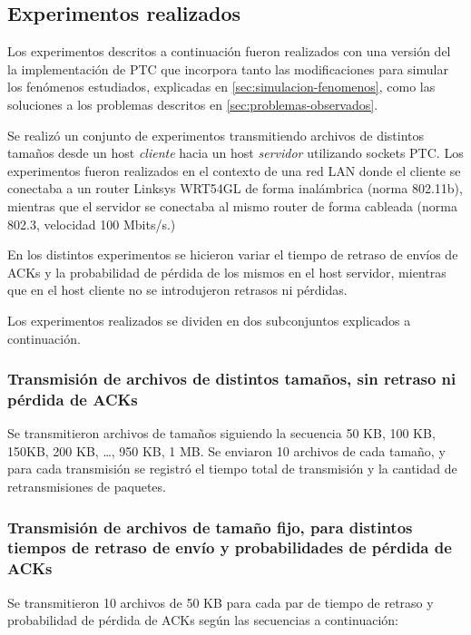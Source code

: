 \documentclass[a4paper, 10pt, twoside]{article}
\begin{document}
\subsection{Experimentos realizados}
\label{sec:experimentos}

Los experimentos descritos a continuación fueron realizados con una versión del la implementación de PTC que incorpora tanto las modificaciones para simular los fenómenos estudiados, explicadas en \ref{sec:simulacion-fenomenos}, como las soluciones a los problemas descritos en \ref{sec:problemas-observados}.

Se realizó un conjunto de experimentos transmitiendo archivos de distintos tamaños desde un host \emph{cliente} hacia un host \emph{servidor} utilizando sockets PTC. Los experimentos fueron realizados en el contexto de una red LAN donde el cliente se conectaba a un router Linksys WRT54GL de forma inalámbrica (norma 802.11b), mientras que el servidor se conectaba al mismo router de forma cableada (norma 802.3, velocidad 100 Mbits/s.)

En los distintos experimentos se hicieron variar el tiempo de retraso de envíos de ACKs y la probabilidad de pérdida de los mismos en el host servidor, mientras que en el host cliente no se introdujeron retrasos ni pérdidas.

Los experimentos realizados se dividen en dos subconjuntos explicados a continuación.


\subsubsection{Transmisión de archivos de distintos tamaños, sin retraso ni pérdida de ACKs}

Se transmitieron archivos de tamaños siguiendo la secuencia 50 KB, 100 KB, 150KB, 200 KB, \ldots, 950 KB, 1 MB. Se enviaron 10 archivos de cada tamaño, y para cada transmisión se registró el tiempo total de transmisión y la cantidad de retransmisiones de paquetes.


\subsubsection{Transmisión de archivos de tamaño fijo, para distintos tiempos de retraso de envío y probabilidades de pérdida de ACKs}

Se transmitieron 10 archivos de 50 KB para cada par de tiempo de retraso y probabilidad de pérdida de ACKs según las secuencias a continuación:
\end{document}
